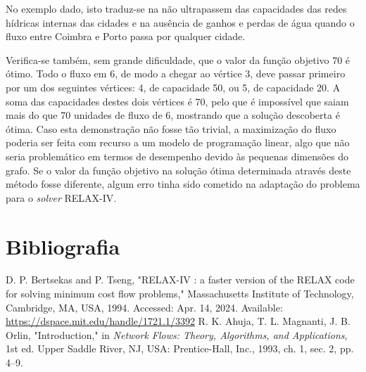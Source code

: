 \documentclass[12pt, a4paper, titlepage]{article}
\begin{document}
No exemplo dado, isto traduz-se na não ultrapassem das capacidades das redes hídricas internas das
cidades e na ausência de ganhos e perdas de água quando o fluxo entre Coimbra e Porto passa por
qualquer cidade.

Verifica-se também, sem grande dificuldade, que o valor da função objetivo 70 é ótimo. Todo o fluxo
em 6, de modo a chegar ao vértice 3, deve passar primeiro por um dos seguintes vértices: 4, de
capacidade 50, ou 5, de capacidade 20. A soma das capacidades destes dois vértices é 70, pelo que é
impossível que saiam mais do que 70 unidades de fluxo de 6, mostrando que a solução descoberta é
ótima. Caso esta demonstração não fosse tão trivial, a maximização do fluxo poderia ser feita com
recurso a um modelo de programação linear, algo que não seria problemático em termos de desempenho
devido às pequenas dimensões do grafo. Se o valor da função objetivo na solução ótima determinada
através deste método fosse diferente, algum erro tinha sido cometido na adaptação do problema para o
\emph{solver} RELAX-IV.

\section{Bibliografia}
\def\refname{}
\vspace{-1.5cm}
\begin{thebibliography}{9}
        D. P. Bertsekas and P. Tseng, "RELAX-IV : a faster version of the RELAX code for solving
        minimum cost flow problems,"{} Massachusetts Institute of Technology, Cambridge, MA, USA,
        1994. Accessed: Apr. 14, 2024. Available: \url{https://dspace.mit.edu/handle/1721.1/3392}
        R. K. Ahuja, T. L. Magnanti, J. B. Orlin, "Introduction,"{} in \emph{Network Flows: Theory,
        Algorithms, and Applications}, 1st ed. Upper Saddle River, NJ, USA: Prentice-Hall, Inc.,
        1993, ch. 1, sec. 2, pp. 4--9.
\end{thebibliography}
\end{document}

